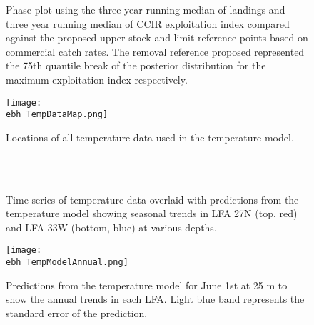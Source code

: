 \begin{figure}
        \centering
                    \caption{Phase plot using the three year running median of landings and three year running median of CCIR exploitation index compared against the proposed upper stock and limit reference points based on commercial catch rates. The removal reference proposed represented the 75th quantile break of the posterior distribution for the maximum exploitation index respectively.}
        \end{figure}


\iffalse

    \begin{figure}
    \centering
        \texttt{[image: \\ebh TempDataMap.png]}
        \caption{Locations of all temperature data used in the temperature model.}

    \end{figure}

        \begin{figure}
        \centering
                \\
                \\
        
         \caption{Time series of temperature data overlaid with predictions from the temperature model showing seasonal trends in LFA 27N (top, red) and LFA 33W (bottom, blue) at various depths.}
        \end{figure}



    \begin{figure}
    \centering
        \texttt{[image: \\ebh TempModelAnnual.png]}
        \caption{Predictions from the temperature model for June 1st at 25 m to show the annual trends in each LFA. Light blue band represents the standard error of the prediction.}

    \end{figure}
  
